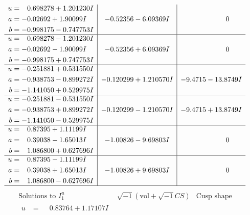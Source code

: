\documentclass[1p]{elsarticle_modified}
\theoremstyle{definition}
\newcommand{\I}{\sqrt{-1}}
\begin{document}
$$\begin{array}{c|c|c}
\begin{aligned}
u &= \phantom{-}0.698278 + 1.201230 I \\
a &= -0.02692 + 1.90099 I \\
b &= -0.998175 - 0.747753 I\end{aligned}
 & -0.52356 - 6.09369 I & \phantom{-0.000000 } 0 \\ \hline\begin{aligned}
u &= \phantom{-}0.698278 - 1.201230 I \\
a &= -0.02692 - 1.90099 I \\
b &= -0.998175 + 0.747753 I\end{aligned}
 & -0.52356 + 6.09369 I & \phantom{-0.000000 } 0 \\ \hline\begin{aligned}
u &= -0.251881 + 0.531550 I \\
a &= -0.938753 - 0.899272 I \\
b &= -1.141050 + 0.529975 I\end{aligned}
 & -0.120299 + 1.210570 I & -9.4715 - 13.8749 I \\ \hline\begin{aligned}
u &= -0.251881 - 0.531550 I \\
a &= -0.938753 + 0.899272 I \\
b &= -1.141050 - 0.529975 I\end{aligned}
 & -0.120299 - 1.210570 I & -9.4715 + 13.8749 I \\ \hline\begin{aligned}
u &= \phantom{-}0.87395 + 1.11199 I \\
a &= \phantom{-}0.39038 - 1.65013 I \\
b &= \phantom{-}1.086800 + 0.627696 I\end{aligned}
 & -1.00826 - 9.69803 I & \phantom{-0.000000 } 0 \\ \hline\begin{aligned}
u &= \phantom{-}0.87395 - 1.11199 I \\
a &= \phantom{-}0.39038 + 1.65013 I \\
b &= \phantom{-}1.086800 - 0.627696 I\end{aligned}
 & -1.00826 + 9.69803 I & \phantom{-0.000000 } 0\\
 \hline 
 \end{array}$$\newpage$$\begin{array}{c|c|c}  
\text{Solutions to }I^u_{1}& \I (\text{vol} + \sqrt{-1}CS) & \text{Cusp shape}\\
 \hline 
\begin{aligned}
u &= \phantom{-}0.83764 + 1.17107 I \\

\end{aligned}
\end{array}$$
\end{document}
